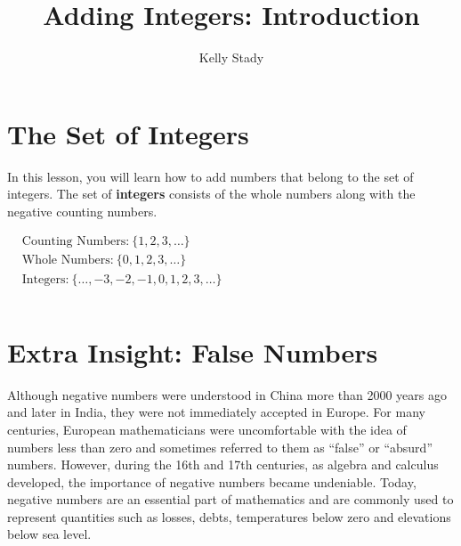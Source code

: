\documentclass{ximera}[font=12pt]
\title{Adding Integers: Introduction}   %
\author{Kelly Stady}
\begin{document}
  


\begin{abstract}

\end{abstract}


\maketitle
\label{xim:AddIntroActivity}


\section*{The Set of Integers}

In this lesson, you will learn how to add numbers that belong to the set of integers.  The set of \textbf{integers} consists of the whole numbers along with the negative counting numbers.

\begin{flushleft}
\hspace{5em} %
$\begin{aligned}
& \textrm{Counting Numbers:} \ \{1, 2, 3, \dots\} \\[1.8ex]
& \textrm{Whole Numbers:} \ \{0, 1, 2, 3, \dots\} \\[1.8ex]
& \textrm{Integers:} \ \{ \ldots, -3, -2, -1, 0, 1, 2, 3, \ldots \} \\
& \\ %
\end{aligned} $
\end{flushleft}


\section*{Extra Insight: False Numbers}

Although negative numbers were understood in China more than 2000 years ago and later in India, they were not immediately accepted in Europe.
For many centuries, European mathematicians were uncomfortable with the idea of numbers less than zero and sometimes referred to them  as ``false'' or
``absurd'' numbers.  However, during the 16th and 17th centuries, as algebra and calculus developed, the importance of negative numbers became undeniable.
Today, negative numbers are an essential part of mathematics and are commonly used to represent quantities such as losses, debts, temperatures below zero and
elevations below sea level.
\end{document}
